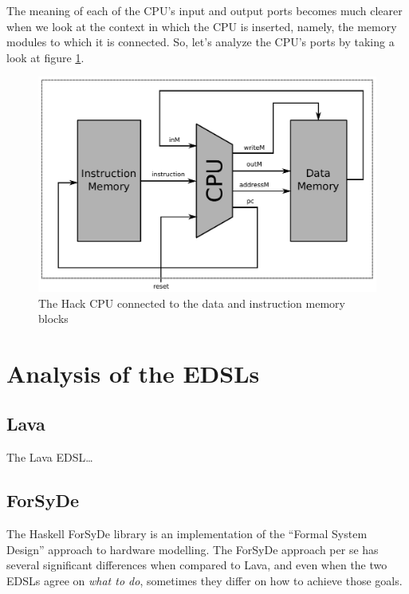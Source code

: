 \documentclass[a4paper]{article}
\begin{document}
            The meaning of each of the CPU's input and output ports becomes much clearer when we
            look at the context in which the CPU is inserted, namely, the memory modules to which it
            is connected. So, let's analyze the CPU's ports by taking a look at figure
            \ref{fig:cpu-memory}.
            \begin{figure}[h]
                \begin{center}
                    \includegraphics[width=1.0\textwidth]{imgs/cpu-memory.pdf}
                \end{center}
                \label{fig:cpu-memory}
                \caption{The Hack CPU connected to the data and instruction memory blocks}
            \end{figure}

    \section{Analysis of the EDSLs}
    \label{sec:edsls}

        \subsection{Lava}
        \label{subsec:lava}
            The Lava EDSL\ldots

        \subsection{ForSyDe}
        \label{subsec:forsyde}
            The Haskell ForSyDe library is an implementation of the ``Formal System Design''
            approach to hardware modelling\cite{forsyde1999}. The ForSyDe approach per se has
            several significant differences when compared to Lava, and even when the two EDSLs agree
            on \emph{what to do}, sometimes they differ on how to achieve those goals.
\end{document}
